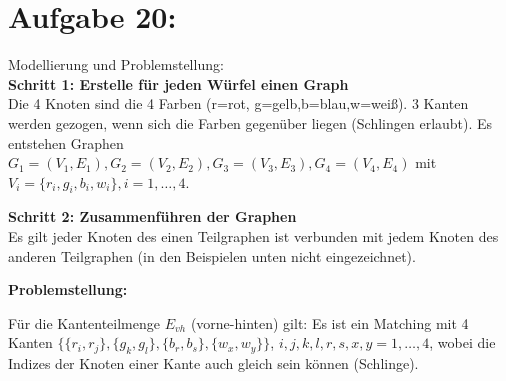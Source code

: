\documentclass[11pt]{scrartcl} %
\newcommand{\addEdge}[1]{
    \foreach \start/\end/\style in {#1}
        \draw [\style] (\start) to (\end);
}
\begin{document}
\section*{Aufgabe 20:}
\begin{compactenum}[(a)]
\item Modellierung und Problemstellung:\\

\textbf{Schritt 1: Erstelle für jeden Würfel einen Graph}\\
Die 4 Knoten sind die 4 Farben (r=rot, g=gelb,b=blau,w=weiß). 3 Kanten werden gezogen, wenn sich die Farben gegenüber liegen (Schlingen erlaubt). Es entstehen Graphen $G_1=(V_1,E_1),G_2=(V_2,E_2),G_3=(V_3,E_3),G_4=(V_4,E_4)$ mit $V_i=\lbrace r_i,g_i,b_i,w_i \rbrace, i=1,\dots, 4$.
\newline

\textbf{Schritt 2: Zusammenführen der Graphen}  \\
Es gilt jeder Knoten des einen Teilgraphen ist verbunden mit jedem Knoten des anderen Teilgraphen (in den Beispielen unten nicht eingezeichnet).
\newline

\textbf{Problemstellung:} \\

\begin{minipage}[h]{0.25\textwidth}
\end{minipage}
\begin{minipage}[h]{0.75\textwidth}
    Für die Kantenteilmenge $E_{vh}$ (vorne-hinten) gilt: Es ist ein Matching mit 4 Kanten $\lbrace \lbrace r_i,r_j \rbrace,\lbrace g_k,g_l\rbrace,\lbrace b_r,b_s \rbrace ,\lbrace w_x,w_y\rbrace \rbrace$, $i,j,k,l,r,s,x,y =1,\dots,4$, wobei die Indizes der Knoten einer Kante auch gleich sein können (Schlinge).



\end{minipage}
\end{compactenum}
\end{document}
